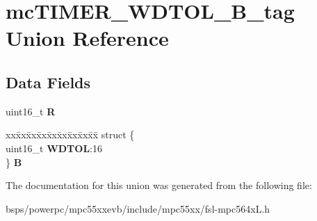\hypertarget{unionmcTIMER__WDTOL__16B__tag}{}\section{mc\+T\+I\+M\+E\+R\+\_\+\+W\+D\+T\+O\+L\+\_\+B\+\_\+tag Union Reference}
\label{unionmcTIMER__WDTOL__16B__tag}
\subsection*{Data Fields}
\begin{DoxyCompactItemize}
\item 
\mbox{\label{unionmcTIMER__WDTOL__16B__tag_af8470ece52e5e66a556c2c89a61604fb}} 
uint16\+\_\+t {\bfseries R}
\item 
\mbox{\label{unionmcTIMER__WDTOL__16B__tag_ac1ec25e0cfa5ce50cd673f981b4af170}} 
\begin{tabbing}
xx\=xx\=xx\=xx\=xx\=xx\=xx\=xx\=xx\=\kill
struct \{\\
\>uint16\_t {\bfseries WDTOL}:16\\
\} {\bfseries B}\\

\end{tabbing}\end{DoxyCompactItemize}


The documentation for this union was generated from the following file\+:\begin{DoxyCompactItemize}
\item 
bsps/powerpc/mpc55xxevb/include/mpc55xx/fsl-\/mpc564x\+L.\+h\end{DoxyCompactItemize}
